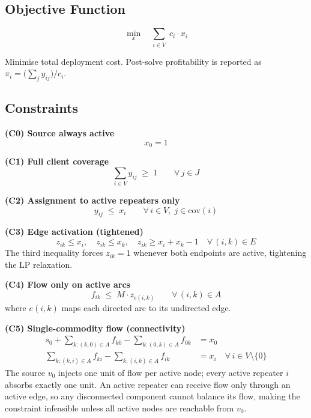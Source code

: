 \documentclass[10pt,a4paper,twocolumn]{article}
\begin{document}
\subsection{Objective Function}

\begin{equation}
  \min_{x} \quad \sum_{i \in V}\; c_i \cdot x_i
  \tag{P}
\end{equation}

Minimise total deployment cost. Post-solve profitability is reported as
$\pi_i = \bigl(\sum_j y_{ij}\bigr)/c_i$.

\subsection{Constraints}

\textbf{(C0) Source always active}
\begin{equation}
  x_0 = 1
  \tag{C0}
\end{equation}

\textbf{(C1) Full client coverage}
\begin{equation}
  \sum_{i \in V} y_{ij} \;\geq\; 1
  \qquad \forall\,j \in J
  \tag{C1}
\end{equation}

\textbf{(C2) Assignment to active repeaters only}
\begin{equation}
  y_{ij} \;\leq\; x_i
  \qquad \forall\,i \in V,\; j \in \mathrm{cov}(i)
  \tag{C2}
\end{equation}

\textbf{(C3) Edge activation (tightened)}
\begin{equation}
  z_{ik} \leq x_i,\quad z_{ik} \leq x_k,\quad
  z_{ik} \geq x_i + x_k - 1
  \quad \forall\,(i,k)\in E
  \tag{C3}
\end{equation}
The third inequality forces $z_{ik}=1$ whenever both endpoints are
active, tightening the LP relaxation.

\textbf{(C4) Flow only on active arcs}
\begin{equation}
  f_{ik} \;\leq\; M \cdot z_{e(i,k)}
  \qquad \forall\,(i,k)\in A
  \tag{C4}
\end{equation}
where $e(i,k)$ maps each directed arc to its undirected edge.

\textbf{(C5) Single-commodity flow (connectivity)}
\begin{align}
  s_0 + \!\!\sum_{k:(k,0)\in A}\!\! f_{k0}
       - \!\!\sum_{k:(0,k)\in A}\!\! f_{0k}
  &= x_0
  \tag{C5a} \\
  \sum_{k:(k,i)\in A}\!\! f_{ki}
  - \!\!\sum_{k:(i,k)\in A}\!\! f_{ik}
  &= x_i
  \quad \forall\,i \in V\setminus\{0\}
  \tag{C5b}
\end{align}
The source $v_0$ injects one unit of flow per active node; every active
repeater $i$ absorbs exactly one unit. An active repeater can receive
flow only through an active edge, so any disconnected component cannot
balance its flow, making the constraint infeasible unless all active
nodes are reachable from $v_0$.
\end{document}
